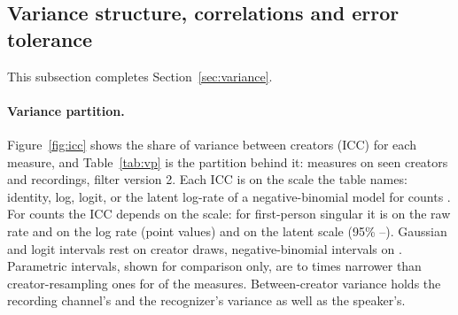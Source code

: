 \begin{table}[tp]
\centering
\small

\caption{Missingness by listing rank and recording properties. Top: odds ratios (OR) for ranks 1--5 against 6--20,
pooled (0.5 added per cell), Mantel--Haenszel (MH) within creator and conditional logit (Wald interval), with 95\%
creator-bootstrap intervals, and the creators with variation in the outcome (Cr.). Bottom: standardized mean differences
of recordings with other text (O) and of recordings with no text (M) against transcribed recordings (T), with 90\%
creator-bootstrap intervals; E1 and E3 are levels of date evidence. Event counts and group sizes are not printed: beside
the census counts some would give a cell of fewer than 5 by difference. For the same reason the creators of ``no text
of any kind'' are not printed (n.p.): beside the printed creator counts of its two parts they would give the creators
with both by difference.}
\label{tab:rank-odds}
\end{table}

\subsection{Variance structure, correlations and error tolerance}
\label{app:variance}

This subsection completes Section~\ref{sec:variance}.

\paragraph{Variance partition.} Figure~\ref{fig:icc} shows the share of variance between creators (ICC) for each
measure, and Table~\ref{tab:vp} is the partition behind it: \VpMeasures{} measures on \VpCreators{} seen creators and
\VpRecordings{} recordings, filter version 2. Each ICC is on the scale the table names: identity, log, logit, or the
latent log-rate of a negative-binomial model for counts \citep{nakagawa2017coefficient}. For counts the ICC depends on
the scale: for first-person singular it is \IccFsRaw{} on the raw rate and \IccFsLog{} on the log rate (point values)
and \IccFs{} on the latent scale (95\% \IccFsLo--\IccFsHi). Gaussian and logit intervals rest on \VpDrawsGauss{} creator
draws, negative-binomial intervals on \VpDrawsNb. Parametric intervals, shown for comparison only, are \ParamNarrowLo{}
to \ParamNarrowHi{} times narrower than creator-resampling ones for \ParamNarrowRows{} of the \VpMeasures{} measures.
Between-creator variance holds the recording channel's and the recognizer's variance as well as the speaker's.

